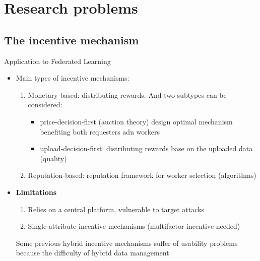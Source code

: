

\section{Research problems}

\subsection{The incentive mechanism}

\begin{frame}{Application to Federated Learning}
  \begin{itemize}
    \item Main types of incentive mechanisms:
          \begin{enumerate}
            \item \alert{Monetary-based}: distributing rewards. And two subtypes can be considered\cite{paper16}:
            	\begin{itemize}
            	\item \alert{price-decision-first} (auction theory) design optimal mechanism benefiting both requesters adn workers
            	\item \alert{upload-decision-first}: distributing rewards base on the uploaded data (quality)
          		\end{itemize}
            \item \alert{Reputation-based}: reputation framework for worker selection (algorithms)
          \end{enumerate}
    \item \textbf{Limitations}
    	\begin{enumerate}
            \item Relies on a central platform, vulnerable to target attacks
            \item Single-attribute incentive mechanisms (multifactor incentive needed)
          \end{enumerate}
     Some previous hybrid incentive mechanisms\cite{paper52} suffer of usability problems because the difficulty of hybrid data management
  \end{itemize}
\end{frame}

